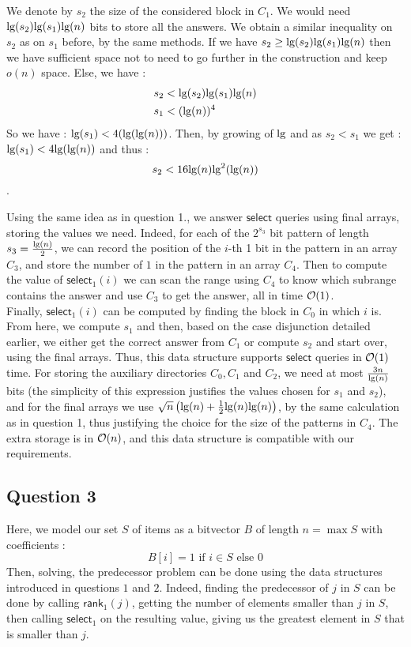 \documentclass{cours}
\begin{document}
We denote by $s_{2}$ the size of the considered block in $C_{1}$. We would need $\textmd{lg}(s_{2})\textmd{lg}(s_{1})\textmd{lg}(n)$ bits to store all the answers. We obtain a similar inequality on $s_{2}$ as on $s_{1}$ before, by the same methods. If we have $s_{2} \geq \textmd{lg}(s_{2})\textmd{lg}(s_{1})\textmd{lg}(n)$ then we have sufficient space not to need to go further in the construction and keep $o(n)$ space. Else, we have : 
\[
    \begin{aligned}
        s_{2} &<\textmd{lg}(s_{2})\textmd{lg}(s_{1})\textmd{lg}(n)\\
        s_{1} &< (\textmd{lg}(n))^{4}
    \end{aligned}    
\]
So we have : $\textmd{lg}(s_{1}) < 4(\textmd{lg}(\textmd{lg}(n)))$. 
Then, by growing of $\textmd{lg}$ and as $s_{2} < s_{1}$ we get : $\textmd{lg}(s_{1}) < 4 \textmd{lg}(\textmd{lg}(n))$ and thus : \[s_{2} < 16 \textmd{lg}(n) \textmd{lg}^{2}(\textmd{lg}(n))\].

Using the same idea as in question 1., we answer $\textsf{select}$ queries using final arrays, storing the values we need. Indeed, for each of the $2^{s_{3}}$ bit pattern of length $s_{3} = \frac{\textmd{lg}(n)}{2}$, we can record the position of the $i$-th 1 bit in the pattern in an array $C_{3}$, and store the number of $1$ in the pattern in an array $C_{4}$. Then to compute the value of $\textsf{select}_{1}(i)$ we can scan the range using $C_{4}$ to know which subrange contains the answer and use $C_{3}$ to get the answer, all in time $\mathcal{O}(1)$.\\

Finally, $\textsf{select}_{1}(i)$ can be computed by finding the block in $C_{0}$ in which $i$ is. From here, we compute $s_{1}$ and then, based on the case disjunction detailed earlier, we either get the correct answer from $C_{1}$ or compute $s_{2}$ and start over, using the final arrays. Thus, this data structure supports $\textsf{select}$ queries in $\mathcal{O}(1)$ time. 
For storing the auxiliary directories $C_{0}, C_{1}$ and $C_{2}$, we need at most $\frac{3n}{\textmd{lg}(n)}$ bits (the simplicity of this expression justifies the values chosen for $s_{1}$ and $s_{2}$), and for the final arrays we use $\sqrt{n}\left(\textmd{lg}(n) + \frac{1}{2}\textmd{lg}(n)\textmd{lg}(n)\right)$, by the same calculation as in question 1, thus justifying the choice for the size of the patterns in $C_{4}$. The extra storage is in $\mathcal{O}(n)$, and this data structure is compatible with our requirements.

\subsection{Question 3}
Here, we model our set $S$ of items as a bitvector $B$ of length $n = \max S$ with coefficients : \[B[i] = 1 \text{ if } i \in S \text{ else } 0\]
Then, solving, the predecessor problem can be done using the data structures introduced in questions $1$ and $2$. Indeed, finding the predecessor of $j$ in $S$ can be done by calling $\textsf{rank}_{1}(j)$, getting the number of elements smaller than $j$ in $S$, then calling $\textsf{select}_{1}$ on the resulting value, giving us the greatest element in $S$ that is smaller than $j$. 
\end{document}
